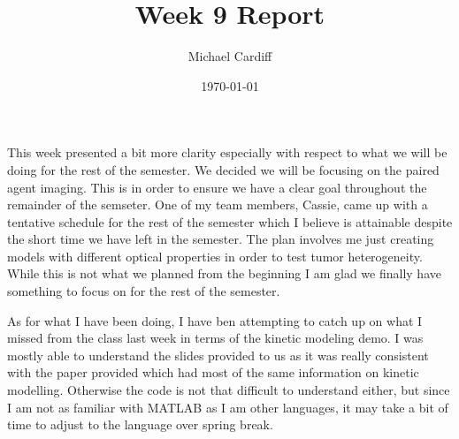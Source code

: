 \documentclass[12pt]{article}
\title{\vspace{-3em}Week 9 Report}
\author{Michael Cardiff}
\date{\today}
\begin{document}
\maketitle
This week presented a bit more clarity especially with respect to what we will be doing for the rest of the semester. We decided we will be focusing on the paired agent imaging. This is in order to ensure we have a clear goal throughout the remainder of the semseter. One of my team members, Cassie, came up with a tentative schedule for the rest of the semester which I believe is attainable despite the short time we have left in the semester. The plan involves me just creating models with different optical properties in order to test tumor heterogeneity. While this is not what we planned from the beginning I am glad we finally have something to focus on for the rest of the semester.

As for what I have been doing, I have ben attempting to catch up on what I missed from the class last week in terms of the kinetic modeling demo. I was mostly able to understand the slides provided to us as it was really consistent with the paper provided which had most of the same information on kinetic modelling. Otherwise the code is not that difficult to understand either, but since I am not as familiar with MATLAB as I am other languages, it may take a bit of time to adjust to the language over spring break. 
\end{document}
